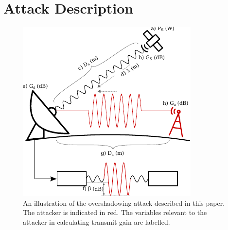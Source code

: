 \section{Attack Description}\label{sec:attack}

\begin{figure}
  \centering
  \includegraphics[width=\columnwidth]{diagrams/maths.pdf}
  \caption{An illustration of the overshadowing attack described in this paper. The attacker is indicated in red. The variables relevant to the attacker in calculating transmit gain are labelled.}
  \label{fig:variables}
\end{figure}



